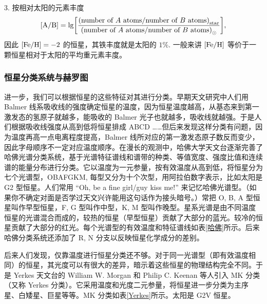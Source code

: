 \documentclass[../天体物理基础.tex]{subfiles}
\begin{document}
3. 按相对太阳的元素丰度
\begin{equation}
\mleft[\ce{A}/\ce{B}\mright]=\lg\mleft[\frac{\mleft(\text{number of $A$ atoms/number of $B$ atoms}\mright)_{\mathrm{star}}}{\mleft(\text{number of $A$ atoms/number of $B$ atoms}\mright)_{\odot}}\mright],
\end{equation}
因此 $\mleft[\ce{Fe/H}\mright]=-2$ 的恒星，其铁丰度就是太阳的 $1\%$. 一般来讲 $\mleft[\ce{Fe/H}\mright]$ 等价于一颗恒星相对于太阳的平均重元素丰度。

\subsubsection{恒星分类系统与赫罗图}
进一步，我们可以根据恒星的这些特征对其进行分类。早期天文研究中人们用 Balmer 线系吸收线的强度确定恒星的温度，因为恒星温度越高，从基态来到第一激发态的氢原子就越多，能吸收的 Balmer 光子也就越多，吸收线就越强。于是人们根据吸收线强度从高到低将恒星排成 ABCD ……但后来发现这样分类有问题，因为温度再高一点电离程度提高，Balmer 线所对应的第一激发态原子数反而变少，因此字母顺序不一定对应温度顺序。在漫长的观测中，哈佛大学天文台逐渐完善了哈佛光谱分类系统，基于光谱特征谱线和谱带的种类、等值宽度、强度比值和连续谱的能量分布进行分类。它以温度为一元参量，按有效温度从高到低，将恒星分为七个光谱型，OBAFGKM, 每型又分为十个次型，用阿拉伯数字表示，比如太阳是 G2 型恒星。人们常用 ``Oh, be a fine girl/guy kiss me!'' 来记忆哈佛光谱型。（如果你不确定对面是否学过天文兴许能用这句话作为接头暗号。）常把 O, B, A 型恒星叫作早型恒星，F, G 型叫作中型，K, M 型叫作晚型。星系光谱是由不同温度恒星的光谱混合而成的，较热的恒星（早型恒星）贡献了大部分的蓝光。较冷的恒星贡献了大部分的红光。每个光谱型的有效温度和特征谱线如表\ref{哈佛}所示。后来哈佛分类系统还添加了 R, N 分支以反映恒星化学成分的差别。

后来人们发现，仅靠温度进行恒星分类还不够。对于同一光谱型（即有效温度相同）的恒星，其光度可以有很大的差异，暗示着这些恒星的物理结构完全不同。于是 Yerkes 天文台的 William W. Morgan 和 Philip C. Keenan 等人引入 MK 分类（又称 Yerkes 分类）。它采用温度和光度二元参量，将恒星进一步分类为主序星、白矮星、巨星等等。MK 分类如表\ref{Yerkes}所示。太阳是 G2V 恒星。
\end{document}
